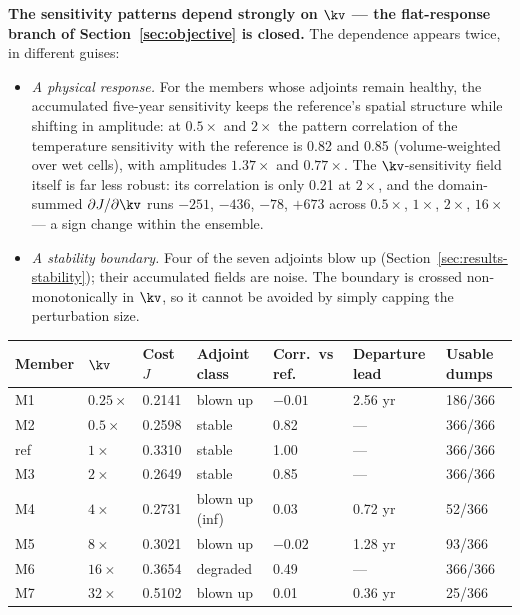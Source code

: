 \textbf{The sensitivity patterns depend strongly on $\kv$ --- the flat-response
branch of Section~\ref{sec:objective} is closed.} The dependence appears twice,
in different guises:

\begin{itemize}[nosep]
  \item \emph{A physical response.} For the members whose adjoints remain
        healthy, the accumulated five-year sensitivity keeps the reference's
        spatial structure while shifting in amplitude: at $0.5\times$ and
        $2\times$ the pattern correlation of the temperature sensitivity with
        the reference is 0.82 and 0.85 (volume-weighted over wet cells), with
        amplitudes $1.37\times$ and $0.77\times$. The $\kv$-sensitivity field
        itself is far less robust: its correlation is only 0.21 at $2\times$,
        and the domain-summed $\partial J/\partial\kv$ runs $-251$, $-436$,
        $-78$, $+673$ across $0.5\times$, $1\times$, $2\times$, $16\times$ ---
        a sign change within the ensemble.
  \item \emph{A stability boundary.} Four of the seven adjoints blow up
        (Section~\ref{sec:results-stability}); their accumulated fields are
        noise. The boundary is crossed non-monotonically in $\kv$, so it cannot
        be avoided by simply capping the perturbation size.
\end{itemize}

\begin{center}
\begin{tabularx}{\textwidth}{@{}lY{0.7}Y{0.8}Y{1.2}Y{1.1}Y{1.2}Y{1.0}@{}}
\toprule
\textbf{Member} & \textbf{$\kv$} & \textbf{Cost $J$} & \textbf{Adjoint class}
 & \textbf{Corr.\ vs ref.} & \textbf{Departure lead} & \textbf{Usable dumps}\\
\midrule
M1 & $0.25\times$ & 0.2141 & blown up        & $-0.01$ & 2.56 yr & 186/366\\
M2 & $0.5\times$  & 0.2598 & stable          & 0.82    & ---     & 366/366\\
ref & $1\times$   & 0.3310 & stable          & 1.00    & ---     & 366/366\\
M3 & $2\times$    & 0.2649 & stable          & 0.85    & ---     & 366/366\\
M4 & $4\times$    & 0.2731 & blown up (inf)  & 0.03    & 0.72 yr & 52/366\\
M5 & $8\times$    & 0.3021 & blown up        & $-0.02$ & 1.28 yr & 93/366\\
M6 & $16\times$   & 0.3654 & degraded        & 0.49    & ---     & 366/366\\
M7 & $32\times$   & 0.5102 & blown up        & 0.01    & 0.36 yr & 25/366\\
\bottomrule
\end{tabularx}
\end{center}

